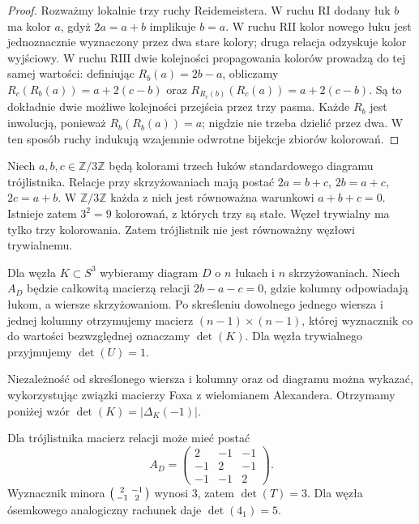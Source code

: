 \begin{proof}
Rozważmy lokalnie trzy ruchy Reidemeistera. W ruchu $\mathrm{R I}$
dodany łuk $b$ ma kolor $a$, gdyż $2a=a+b$ implikuje $b=a$.
W ruchu $\mathrm{R II}$ kolor nowego łuku jest jednoznacznie
wyznaczony przez dwa stare kolory; druga relacja odzyskuje
kolor wyjściowy.
W ruchu $\mathrm{R III}$ dwie kolejności propagowania kolorów
prowadzą do tej samej wartości: definiując $R_b(a)=2b-a$,
obliczamy $R_c(R_b(a))=a+2(c-b)$ oraz
$R_{R_c(b)}(R_c(a))=a+2(c-b)$. Są to dokładnie dwie
możliwe kolejności przejścia przez trzy pasma. Każde $R_b$
jest inwolucją, ponieważ $R_b(R_b(a))=a$; nigdzie nie
trzeba dzielić przez dwa. W ten sposób ruchy indukują
wzajemnie odwrotne bijekcje zbiorów kolorowań.
\end{proof}

\begin{przyklad}
Niech $a,b,c\in\mathbb Z/3\mathbb Z$ będą kolorami trzech łuków
standardowego diagramu trójlistnika. Relacje przy skrzyżowaniach
mają postać $2a=b+c$, $2b=a+c$, $2c=a+b$.
W $\mathbb Z/3\mathbb Z$ każda z nich jest równoważna warunkowi
$a+b+c=0$. Istnieje zatem $3^2=9$ kolorowań, z których
trzy są stałe. Węzeł trywialny ma tylko trzy kolorowania.
Zatem trójlistnik nie jest równoważny węzłowi trywialnemu.
\end{przyklad}

\begin{definicja}
Dla węzła $K\subset S^3$ wybieramy diagram $D$ o $n$ łukach
i $n$ skrzyżowaniach. Niech $A_D$ będzie całkowitą macierzą
relacji $2b-a-c=0$, gdzie kolumny odpowiadają łukom, a wiersze
skrzyżowaniom. Po skreśleniu dowolnego jednego wiersza i jednej
kolumny otrzymujemy macierz $(n-1)\times(n-1)$, której wyznacznik
co do wartości bezwzględnej oznaczamy $\det(K)$.
Dla węzła trywialnego przyjmujemy $\det(U)=1$.
\end{definicja}

Niezależność od skreślonego wiersza i kolumny oraz od diagramu
można wykazać, wykorzystując związki macierzy Foxa z wielomianem
Alexandera. Otrzymamy poniżej wzór $\det(K)=|\Delta_K(-1)|$.

\begin{przyklad}
Dla trójlistnika macierz relacji może mieć postać
\[
A_D=\begin{pmatrix}2&-1&-1\\-1&2&-1\\-1&-1&2\end{pmatrix}.
\]
Wyznacznik minora $\begin{psmallmatrix}2&-1\\-1&2\end{psmallmatrix}$
wynosi $3$, zatem $\det(T)=3$. Dla węzła ósemkowego
analogiczny rachunek daje $\det(4_1)=5$.
\end{przyklad}

